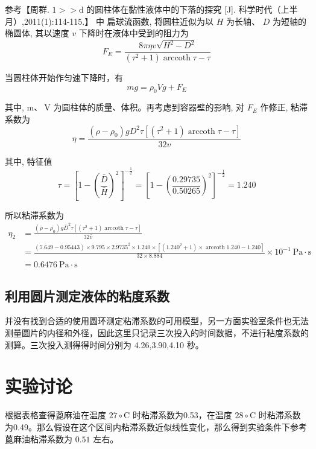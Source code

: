 \documentclass[10pt,a4paper]{article}	%
\begin{document}
参考【周群. $1>>\mathrm{d}$ 的圆柱体在黏性液体中的下落的探究 [J]. 科学时代（上半月）,2011(1):114-115.】 中 扁球流函数, 将圆柱近似为以 $H$ 为长轴、 $D$ 为短轴的椭圆体, 其以速度 $v$ 下降时在液体中受到的阻力为
$$
F_E=\frac{8 \pi \eta v \sqrt{H^2-D^2}}{\left(\tau^2+1\right) \operatorname{arccoth} \tau-\tau}
$$

当圆柱体开始作匀速下降时，有
$$
m g=\rho_0 V g+F_E
$$

其中, $\mathrm{m} 、 \mathrm{~V}$ 为圆柱体的质量、体积。再考虑到容器壁的影响, 对 $F_E$ 作修正, 粘滞系数为
$$
\eta=\frac{\left(\rho-\rho_0\right) g D^2 \tau\left[\left(\tau^2+1\right) \operatorname{arccoth} \tau-\tau\right]}{32 v}
$$

其中, 特征值 
$$
\tau=\left[1-\left(\frac{\bar{D}}{\bar{H}}\right)^2\right]^{-\frac{1}{2}}=\left[1-\left(\frac{0.29735}{0.50265}\right)^2\right]^{-\frac{1}{2}} = 1.240
$$

所以粘滞系数为
$$
\begin{aligned}
\eta_2 & =\frac{\left(\bar{\rho}-\overline{\rho_0}\right) g \bar{D}^2 \tau\left[\left(\tau^2+1\right) \operatorname{arccoth} \tau-\tau\right]}{32 \bar{v}} \\
& =\frac{(7.649-0.95443) \times 9.795 \times 2.9735^2 \times 1.240 \times\left[\left(1.240^2+1\right) \times \operatorname{arccoth} 1.240-1.240\right]}{32 \times 8.884} \times 10^{-1} \mathrm{~Pa} \cdot \mathrm{s} \\
& =0.6476 \mathrm{~Pa} \cdot \mathrm{s}
\end{aligned}
$$




	\subsection{利用圆片测定液体的粘度系数}

	并没有找到合适的使用圆环测定粘滞系数的可用模型，另一方面实验室条件也无法测量圆片的内径和外径，因此这里只记录三次投入的时间数据，不进行粘度系数的测算。三次投入测得得时间分别为 4.26,3.90,4.10 秒。

	\section{实验讨论}

	根据表格查得蓖麻油在温度 $27\circ \mathrm{C}$ 时粘滞系数为0.53，在温度 $28\circ \mathrm{C}$ 时粘滞系数为0.49。那么假设在这个区间内粘滞系数近似线性变化，那么得到实验条件下参考蓖麻油粘滞系数为 $0.51$ 左右。
\end{document}
